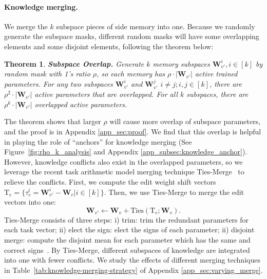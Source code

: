 \documentclass{article}
\newtheorem{theorem}{Theorem}[section]
\begin{document}
\paragraph{Knowledge merging.} 
We merge the $k$ subspace pieces of side memory into one. Because we randomly generate the subspace masks, different random masks will have some overlapping elements and some disjoint elements, following the theorem below: 

\begin{theorem}\label{theorem:subspace_overlap}
    \textbf{Subspace Overlap.} 
    Generate $k$ memory subspaces $\mathbf{W}_{v'}^{i}, i \in [k]$ by random mask with 1's ratio $\rho$, so each memory has $\rho\cdot|\mathbf{W}_{v'}|$ active trained parameters. For any two subspaces $\mathbf{W}_{v'}^{i}$ and $\mathbf{W}_{v'}^{j}$ $i\neq j ;i,j \in [k]$, there are $\rho^2\cdot|\mathbf{W}_{v'}|$ active parameters that are overlapped. For all $k$ subspaces, there are $\rho^k\cdot|\mathbf{W}_{v'}|$ overlapped active parameters.
\end{theorem}
The theorem shows that larger $\rho$ will cause more overlap of subspace parameters, and the proof is in Appendix \ref{app_sec:proof}.
We find that this overlap is helpful in playing the role of ``anchors'' for knowledge merging (See Figure~\ref{fig:rho_k_analysis} and Appendix \ref{app_subsec:knowledge_anchor}).
However, knowledge conflicts also exist in the overlapped parameters, so we leverage the recent task arithmetic model merging technique Ties-Merge~\cite{ties_merge} to relieve the conflicts. 
First, we compute the edit weight shift vectors $\mathrm{T}_e =\{ \tau_{e}^{i} = \mathbf{W}_{v'}^{i} - \mathbf{W}_v| i \in [k]\}$. 
Then, we use Ties-Merge to merge the edit vectors into one:
\begin{equation}\label{equ:ties_update}
    \mathbf{W}_{v'} \leftarrow \mathbf{W}_{v} +\text{Ties}(\mathrm{T}_e;\mathbf{W}_{v}).
\end{equation}
Ties-Merge consists of three steps: i) trim: trim the redundant parameters for each task vector; ii) elect the sign: elect the signs of each parameter; ii) disjoint merge: compute the disjoint mean for each parameter which has the same and correct signs~\cite{ties_merge}. 
By Ties-Merge, different subspaces of knowledge are integrated into one with fewer conflicts. 
We study the effects of different merging techniques in Table~\ref{tab:knowledge-merging-strategy} of Appendix \ref{app_sec:varying_merge}.
\end{document}

